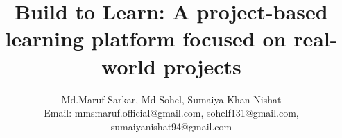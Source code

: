 \documentclass[final,3p,times,twocolumn]{elsarticle}
\begin{document}
\begin{frontmatter}



\title{Build to Learn: A project-based learning platform focused on real-world projects
}


\author{
Md.Maruf Sarkar, Md Sohel, Sumaiya Khan Nishat\\
Email: mmsmaruf.official@gmail.com, sohelf131@gmail.com, sumaiyanishat94@gmail.com
} %



\end{frontmatter}
\end{document}
